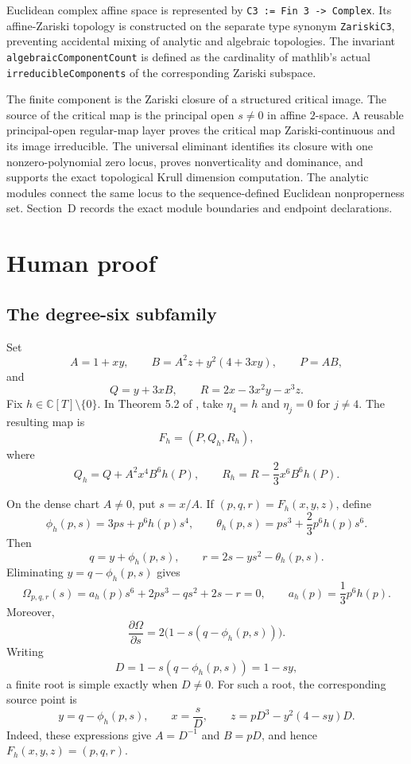 \documentclass[11pt]{article}
\newcommand{\C}{\mathbb{C}}
\begin{document}
Euclidean complex affine space is represented by
\texttt{C3 := Fin 3 -> Complex}.  Its affine-Zariski topology is constructed
on the separate type synonym \texttt{ZariskiC3}, preventing accidental mixing
of analytic and algebraic topologies.  The invariant
\texttt{algebraicComponentCount} is defined as the cardinality of mathlib's
actual \texttt{irreducibleComponents} of the corresponding Zariski subspace.

The finite component is the Zariski closure of a structured critical image.
The source of the critical map is the principal open $s\ne0$ in affine
$2$-space.  A reusable principal-open regular-map layer proves the critical
map Zariski-continuous and its image irreducible.  The universal eliminant
identifies its closure with one nonzero-polynomial zero locus, proves
nonverticality and dominance, and supports the exact topological Krull
dimension computation.  The analytic modules connect the same locus to the
sequence-defined Euclidean nonproperness set.  Section~D records the exact
module boundaries and endpoint declarations.

\section{Human proof}

\subsection{The degree-six subfamily}

Set
\[
 A=1+xy,
 \qquad
 B=A^2z+y^2(4+3xy),
 \qquad
 P=AB,
\]
and
\[
 Q=y+3xB,
 \qquad
 R=2x-3x^2y-x^3z.
\]
Fix $h\in\C[T]\setminus\{0\}$.  In Theorem 5.2 of \cite{source}, take
$\eta_4=h$ and $\eta_j=0$ for $j\ne4$.  The resulting map is
\[
 F_h=(P,Q_h,R_h),
\]
where
\[
 Q_h=Q+A^2x^4B^6h(P),
 \qquad
 R_h=R-\frac23x^6B^6h(P).
\]

On the dense chart $A\ne0$, put $s=x/A$.  If
$(p,q,r)=F_h(x,y,z)$, define
\[
 \phi_h(p,s)=3ps+p^6h(p)s^4,
 \qquad
 \theta_h(p,s)=ps^3+\frac23p^6h(p)s^6.
\]
Then
\[
 q=y+\phi_h(p,s),
 \qquad
 r=2s-ys^2-\theta_h(p,s).
\]
Eliminating $y=q-\phi_h(p,s)$ gives
\begin{equation}
 \boxed{
 \Omega_{p,q,r}(s)
 =a_h(p)s^6+2ps^3-qs^2+2s-r=0,
 \qquad
 a_h(p)=\frac13p^6h(p).}
 \label{eq:omega}
\end{equation}
Moreover,
\begin{equation}
 \frac{\partial\Omega}{\partial s}
 =2\bigl(1-s(q-\phi_h(p,s))\bigr).
 \label{eq:derivative}
\end{equation}
Writing
\[
 D=1-s(q-\phi_h(p,s))=1-sy,
\]
a finite root is simple exactly when $D\ne0$.  For such a root, the
corresponding source point is
\begin{equation}
 y=q-\phi_h(p,s),
 \qquad
 x=\frac{s}{D},
 \qquad
 z=pD^3-y^2(4-sy)D.
 \label{eq:reconstruction}
\end{equation}
Indeed, these expressions give $A=D^{-1}$ and $B=pD$, and hence
$F_h(x,y,z)=(p,q,r)$.
\end{document}
